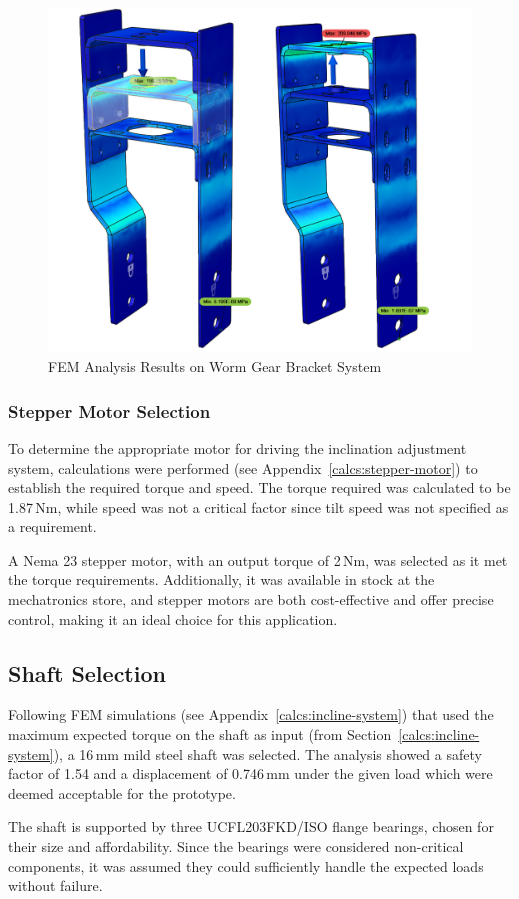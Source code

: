 \begin{figure}[H]
    \centering
    \includegraphics[width=0.6\linewidth]{figs/FEM/incline-braket.png}
    \caption{FEM Analysis Results on Worm Gear Bracket System}
    \label{fig:FEM-incline-brackets}
\end{figure}

\subsubsection{Stepper Motor Selection}
To determine the appropriate motor for driving the inclination adjustment system, calculations were performed (see Appendix~\ref{calcs:stepper-motor}) to establish the required torque and speed. The torque required was calculated to be 1.87\,Nm, while speed was not a critical factor since tilt speed was not specified as a requirement. 

A Nema 23 stepper motor, with an output torque of 2\,Nm, was selected as it met the torque requirements. Additionally, it was available in stock at the mechatronics store, and stepper motors are both cost-effective and offer precise control, making it an ideal choice for this application.

\subsection{Shaft Selection}
Following FEM simulations (see Appendix~\ref{calcs:incline-system}) that used the maximum expected torque on the shaft as input (from Section~\ref{calcs:incline-system}), a 16\,mm mild steel shaft was selected. The analysis showed a safety factor of 1.54 and a displacement of 0.746\,mm under the given load which were deemed acceptable for the prototype.

The shaft is supported by three UCFL203FKD/ISO flange bearings, chosen for their size and affordability. Since the bearings were considered non-critical components, it was assumed they could sufficiently handle the expected loads without failure.


